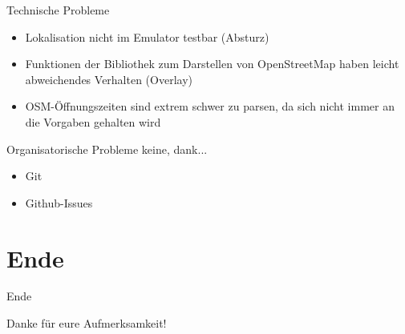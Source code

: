 \documentclass[hyperref]{beamer}
\begin{document}
\begin{frame}{Technische Probleme}
	\begin{itemize}
		\item Lokalisation nicht im Emulator testbar (Absturz)
		\item Funktionen der Bibliothek zum Darstellen von OpenStreetMap haben leicht abweichendes Verhalten (Overlay)
		\item OSM-Öffnungszeiten sind extrem schwer zu parsen, da sich nicht immer an die Vorgaben gehalten wird
	\end{itemize}
\end{frame}


\begin{frame}{Organisatorische Probleme}
	keine, dank...
	\begin{itemize}
		\item Git
		\item Github-Issues
	\end{itemize}
\end{frame}

\section{Ende}
\begin{frame}{Ende}
	\begin{center}
		Danke für eure Aufmerksamkeit!
	\end{center}
\end{frame}
\end{document}
